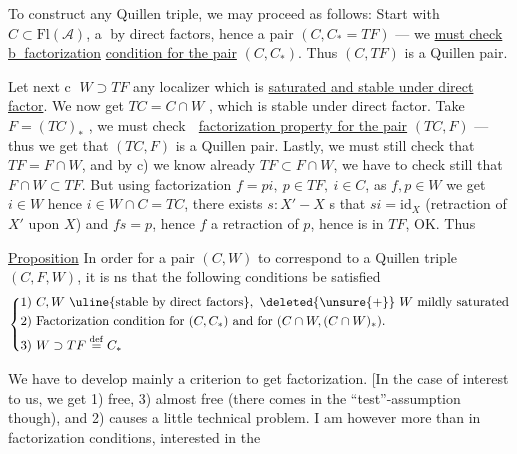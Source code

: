 
To construct any Quillen triple, we may proceed as follows: Start with  $C\subset\mathrm{Fl}(\mathscr A)$, \textcircled{a}   by direct factors, hence a pair $(C,C_*=TF)$ --- we \uline{must check \textcircled{b} factorization} \uline{condition for the pair} $(C,C_*)$.  Thus $(C,TF)$ is a Quillen pair.

Let next \textcircled{c} $\boxed{W\supset TF}$ any localizer which is  \uline{saturated and stable under direct factor}. We now get $TC=C\cap W$ , which is  stable under direct factor. Take $F=(TC)_*$ , we must check \textcircled{} \uline{factorization property for the pair} $(TC,F)$ --- thus we get that $(TC,F)$ is a Quillen pair. Lastly, we must still check that $TF=F\cap W$, and by c) we know already $TF\subset F\cap W$, we have to check still that $F\cap W\subset TF$. But using factorization $f=pi,\ p\in TF,\ i\in C$, as $f,p\in W$ we get $i\in W$ hence $i\in W\cap C=TC$,  there exists $s:X'-X$ s that $si=\mathrm{id}_X$ (retraction of $X'$ upon $X$) and $fs=p$, hence $f$ a retraction of $p$, hence is in $TF$, OK. Thus


\uline{Proposition} In order for a pair  $(C,W)$ to correspond to a Quillen triple $(C,F,W)$, it is ns that the following conditions be satisfied
\[
\left\{\begin{aligned}
1)&\ C,W\ \text{\uline{stable by direct factors}},\ \deleted{\unsure{+}}\ W\text{ mildly saturated}\\
2)&\ \text{Factorization condition for }(C,C_*)\text{ and for }(C\cap W,(C\cap W)_*).\\
3)&\ W\supset TF\overset{\mathrm{def}}=C_*
\end{aligned}\right.
\]

We have to develop mainly a criterion to get factorization. [In the case of interest to us, we get 1) free, 3) almost free (there comes in the ``test''-assumption though), and 2) causes a little technical problem. I am however more than in factorization conditions, interested in the
